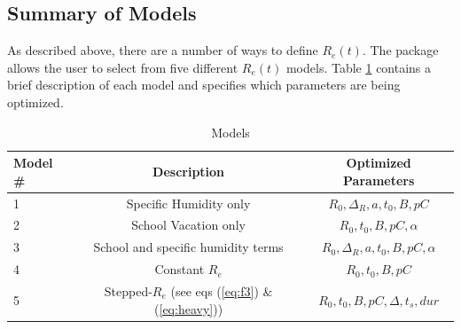 \documentclass[a4paper]{article}
\begin{document}
\subsection{Summary of Models}
As described above, there are a number of ways to define $R_e(t)$.  The  package allows the user to select from five different $R_e(t)$ models.  Table \ref{tab:models} contains a brief description of each model and specifies which parameters are being optimized.
\begin{table}[h]
  \caption{ Models}
  \centering
  \begin{tabular}{| l | c | c |}
    \hline
    Model \# & Description & Optimized Parameters \\ \hline
    1 & Specific Humidity only & $R_{0},\Delta_R,a,t_0,B,pC$ \\  \hline
    2 & School Vacation only & $R_{0},t_0,B,pC,\alpha$ \\  \hline
    3 & School and specific humidity terms & $R_{0},\Delta_R,a,t_0,B,pC,\alpha$ \\  \hline
    4 & Constant $R_e$ & $R_{0},t_0,B,pC$ \\ \hline
    5 & Stepped-$R_e$ (see eqs (\ref{eq:f3}) \& (\ref{eq:heavy})) & $R_{0},t_0,B,pC,\Delta, t_s, dur$ \\ \hline
  \end{tabular}
  \label{tab:models}
\end{table}
\end{document}
